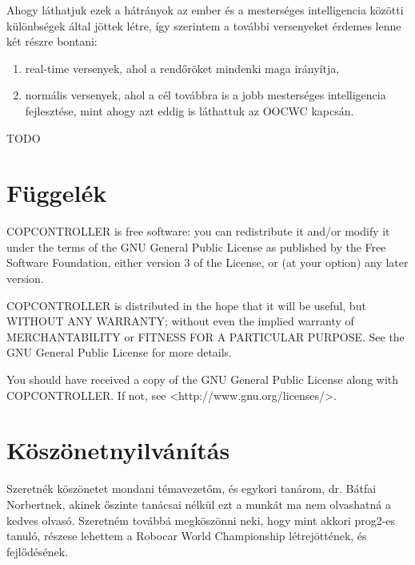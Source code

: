 \documentclass[a4paper,12pt]{report}
\begin{document}
\vspace{2mm}
Ahogy láthatjuk ezek a hátrányok az ember és a mesterséges intelligencia közötti különbségek által jöttek létre, így szerintem a további versenyeket érdemes lenne két részre bontani: 
\begin{enumerate} 
\item real-time versenyek, ahol a rendőröket mindenki maga irányítja, 
\item normális versenyek, ahol a cél továbbra is a jobb mesterséges intelligencia fejlesztése, mint ahogy azt eddig is láthattuk az OOCWC kapcsán.
\end{enumerate}
TODO

\newpage
{}

\begin{singlespace}

\end{singlespace}

\chapter*{Függelék}

\noindent
COPCONTROLLER is free software: you can redistribute it and/or modify
it under the terms of the GNU General Public License as published by
the Free Software Foundation, either version 3 of the License, or
(at your option) any later version.

\noindent
COPCONTROLLER is distributed in the hope that it will be useful,
but WITHOUT ANY WARRANTY; without even the implied warranty of
MERCHANTABILITY or FITNESS FOR A PARTICULAR PURPOSE.  See the
GNU General Public License for more details.

\noindent
You should have received a copy of the GNU General Public License
along with COPCONTROLLER. If not, see <http://www.gnu.org/licenses/>.

\chapter*{Köszönetnyilvánítás}

Szeretnék köszönetet mondani témavezetőm, és egykori tanárom, dr. Bátfai Norbertnek, akinek őszinte tanácsai nélkül ezt a munkát ma nem olvashatná a kedves olvasó. Szeretném továbbá megköszönni neki, hogy mint akkori prog2-es tanuló, részese lehettem a Robocar World Championship létrejöttének, és fejlődésének.
\end{document}
